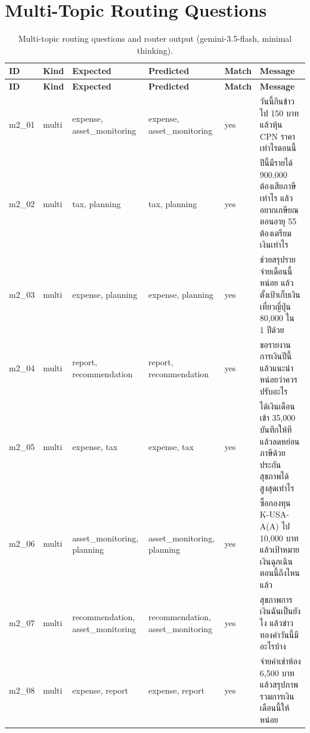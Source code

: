 \documentclass[11pt,a4paper]{article}
\begin{document}
\section{Multi-Topic Routing Questions}
{\scriptsize
\begin{longtable}{llp{3.2cm}p{3.2cm}lp{5.3cm}}
\caption{Multi-topic routing questions and router output (gemini-3.5-flash, minimal thinking).}\label{tab:app-mt}\\
\toprule
\textbf{ID} & \textbf{Kind} & \textbf{Expected} & \textbf{Predicted} & \textbf{Match} & \textbf{Message} \\
\midrule
\endfirsthead
\toprule
\textbf{ID} & \textbf{Kind} & \textbf{Expected} & \textbf{Predicted} & \textbf{Match} & \textbf{Message} \\
\midrule
\endhead
\bottomrule
\endfoot
m2\_\allowbreak{}01 & multi & expense, asset\_\allowbreak{}monitoring & expense, asset\_\allowbreak{}monitoring & yes & {\thaifont วันนี้กินข้าวไป }150 {\thaifont บาท แล้วหุ้น }CPN {\thaifont ราคาเท่าไรตอนนี้} \\
m2\_\allowbreak{}02 & multi & tax, planning & tax, planning & yes & {\thaifont ปีนี้มีรายได้ }900,000 {\thaifont ต้องเสียภาษีเท่าไร แล้วอยากเกษียณตอนอายุ }55 {\thaifont ต้องเตรียมเงินเท่าไร} \\
m2\_\allowbreak{}03 & multi & expense, planning & expense, planning & yes & {\thaifont ช่วยสรุปรายจ่ายเดือนนี้หน่อย แล้วตั้งเป้าเก็บเงินเที่ยวญี่ปุ่น }80,000 {\thaifont ใน }1 {\thaifont ปีด้วย} \\
m2\_\allowbreak{}04 & multi & report, recommendation & report, recommendation & yes & {\thaifont ขอรายงานการเงินปีนี้ แล้วแนะนำหน่อยว่าควรปรับอะไร} \\
m2\_\allowbreak{}05 & multi & expense, tax & expense, tax & yes & {\thaifont ได้เงินเดือนเข้า }35,000 {\thaifont บันทึกให้ที แล้วลดหย่อนภาษีด้วยประกันสุขภาพได้สูงสุดเท่าไร} \\
m2\_\allowbreak{}06 & multi & asset\_\allowbreak{}monitoring, planning & asset\_\allowbreak{}monitoring, planning & yes & {\thaifont ซื้อกองทุน }K-USA-A(A) {\thaifont ไป }10,000 {\thaifont บาท แล้วเป้าหมายเงินฉุกเฉินตอนนี้ถึงไหนแล้ว} \\
m2\_\allowbreak{}07 & multi & recommendation, asset\_\allowbreak{}monitoring & recommendation, asset\_\allowbreak{}monitoring & yes & {\thaifont สุขภาพการเงินฉันเป็นยังไง แล้วข่าวทองคำวันนี้มีอะไรบ้าง} \\
m2\_\allowbreak{}08 & multi & expense, report & expense, report & yes & {\thaifont จ่ายค่าเช่าห้อง }6,500 {\thaifont บาท แล้วสรุปภาพรวมการเงินเดือนนี้ให้หน่อย} \\

\end{longtable}}
\end{document}
